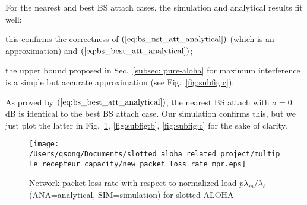 For the nearest and best BS attach cases, the simulation and analytical results fit well:\begin{inparaenum}[i)]
	\item this confirms the correctness of $(\ref{eq:bs_nst_att_analytical})$ (which is an approximation) and $(\ref{eq:bs_best_att_analytical})$;
	\item the upper bound proposed in Sec.~\ref{subsec: pure-aloha} for maximum interference is a simple but accurate approximation (see Fig.~\ref{fig:subfig:c}).
\end{inparaenum} 
As proved by $(\ref{eq:bs_best_att_analytical})$, the nearest BS attach with $\sigma=0$ dB is identical to the best BS attach case. Our simulation confirms this, but we just plot the latter in Fig.~\ref{fig:subfig:a}, \ref{fig:subfig:b}, \ref{fig:subfig:c} for the sake of clarity. 
\begin{figure}[!tb]
	\centering
	\texttt{[image: /Users/qsong/Documents/slotted\_aloha\_related\_project/multiple\_recepteur\_capacity/new\_packet\_loss\_rate\_mpr.eps]}
	\caption{Network packet loss rate with respect to normalized load $p\lambda_{m}/\lambda_{b}$ (ANA=analytical, SIM=simulation) for slotted ALOHA}
	\label{fig:subfig:a} 
\end{figure}

